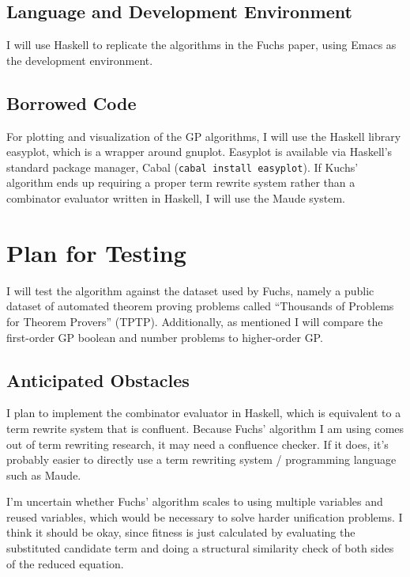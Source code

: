 \documentclass{article}
\begin{document}
\subsection{Language and Development Environment}

I will use Haskell to replicate the algorithms in the Fuchs paper,
using Emacs as the development environment. 

\subsection{Borrowed Code}

For plotting and visualization of the GP algorithms, I will use the
Haskell library easyplot, which is a wrapper around gnuplot. Easyplot
is available via Haskell's standard package manager, Cabal
(\texttt{cabal install easyplot}).
If Kuchs' algorithm ends up requiring a proper term rewrite system
rather than a combinator evaluator written in Haskell, I will use the
Maude system.

\section{Plan for Testing}

I will test the algorithm against the dataset used by Fuchs, namely a
public dataset of automated theorem proving problems called
``Thousands of Problems for Theorem Provers'' (TPTP).
Additionally, as mentioned I will compare the first-order GP boolean
and number problems to higher-order GP.

\subsection{Anticipated Obstacles}

I plan to implement the combinator evaluator in Haskell, which is
equivalent to a term rewrite system that is confluent. Because Fuchs'
algorithm I am using comes out of term rewriting research, it may need
a confluence checker. If it does, it's probably easier to directly use
a term rewriting system / programming language such as Maude.

I'm uncertain whether Fuchs' algorithm scales to using
multiple variables and reused variables, which would be necessary to
solve harder unification problems. I think it should be okay, since fitness is
just calculated by evaluating the substituted candidate term and doing
a structural similarity check of both sides of the reduced equation.
\end{document}
